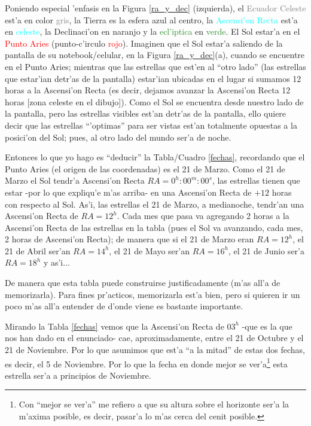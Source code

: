 \documentclass{article}
\begin{document}
\begin{enumerate}[a)]
\begin{enumerate} [i)]
Poniendo especial 'enfasis en la Figura \ref{ra_y_dec} (izquierda), el \textcolor{Gray}{Ecuador Celeste} est'a en color \textcolor{Gray}{gris}, la \textcolor{NavyBlue}{Tierra} es la esfera \textcolor{NavyBlue} {azul} al centro, la \textcolor{Cyan}{Ascensi'on Recta} est'a en \textcolor{Cyan}{celeste}, la \textcolor{Dandelion}{Declinaci'on} en \textcolor{Dandelion}{naranjo} y la \textcolor{ForestGreen}{ecl'iptica} en \textcolor{ForestGreen}{verde}. El Sol estar'a en el \textcolor{Red}{Punto Aries} (punto-c'irculo \textcolor{Red}{rojo}). Imaginen que el Sol estar'a saliendo de la pantalla de su notebook/celular, en la Figura \ref{ra_y_dec}(a), cuando se encuentre en el Punto Aries; mientras que las estrellas que est'en al ``otro lado'' (las estrellas que estar'ian detr'as de la pantalla) estar'ian ubicadas en el lugar si sumamos 12 horas a la Ascensi'on Recta (es decir, dejamos avanzar la Ascensi'on Recta 12 horas [zona celeste en el dibujo]). Como el Sol se encuentra desde nuestro lado de la pantalla, pero las estrellas visibles est'an detr'as de la pantalla, ello quiere decir que las estrellas ``'optimas'' para ser vistas est'an totalmente opuestas a la posici'on del Sol; pues, al otro lado del mundo ser'a de noche.

Entonces lo que yo hago es ``deducir'' la Tabla/Cuadro \ref{fechas}, recordando que el Punto Aries (el origen de las coordenadas) es el 21 de Marzo. Como el 21 de Marzo el Sol tendr'a Ascensi'on Recta $RA =  0^h : 00^m : 00^s$, las estrellas tienen que estar -por lo que expliqu'e m'as arriba- en una Ascensi'on Recta de $+12$ horas con respecto al Sol. As'i, las estrellas el 21 de Marzo, a medianoche, tendr'an una Ascensi'on Recta de $RA = 12^h$. Cada mes que pasa va agregando 2 horas a la Ascensi'on Recta de las estrellas en la tabla (pues el Sol va avanzando, cada mes, 2 horas de Ascensi'on Recta); de manera que si el 21 de Marzo eran $RA = 12^h$, el 21 de Abril ser'an $RA = 14^h$, el 21 de Mayo ser'an $RA = 16^h$, el 21 de Junio ser'a $RA = 18^h$ y as'i...

De manera que esta tabla puede construirse justificadamente (m'as all'a de memorizarla). Para fines pr'acticos, memorizarla est'a bien, pero si quieren ir un poco m'as all'a entender de d'onde viene es bastante importante. 

Mirando la Tabla \ref{fechas} vemos que la Ascensi'on Recta de $03^h$ -que es la que nos han dado en el enunciado- cae, aproximadamente, entre el 21 de Octubre y el 21 de Noviembre. Por lo que asumimos que est'a ``a la mitad'' de estas dos fechas, es decir, el 5 de Noviembre. Por lo que la fecha en donde mejor se ver'a\footnote{Con ``mejor se ver'a'' me refiero a que su altura sobre el horizonte ser'a la m'axima posible, es decir, pasar'a lo m'as cerca del cenit posible.} esta estrella ser'a a principios de Noviembre.


\end{enumerate}
\end{enumerate}
\end{document}
